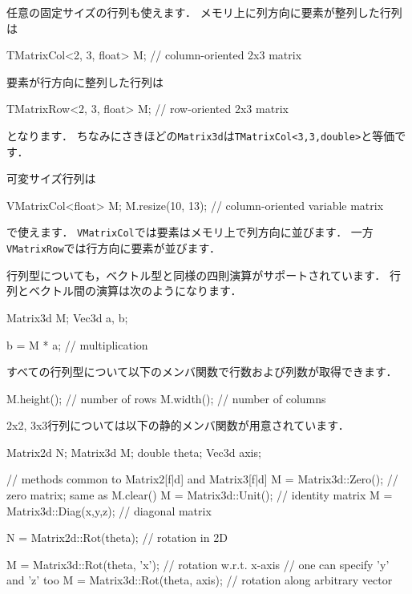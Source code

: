 \KLUDGE 任意の固定サイズの行列も使えます．
\KLUDGE メモリ上に列方向に要素が整列した行列は
\begin{sourcecode}
TMatrixCol<2, 3, float> M;    // column-oriented 2x3 matrix
\end{sourcecode}
\KLUDGE 要素が行方向に整列した行列は
\begin{sourcecode}
TMatrixRow<2, 3, float> M;    // row-oriented 2x3 matrix
\end{sourcecode}
\KLUDGE となります．
\KLUDGE ちなみにさきほどの\texttt{Matrix3d}は\texttt{TMatrixCol<3,3,double>}と等価です．

\KLUDGE 可変サイズ行列は
\begin{sourcecode}
VMatrixCol<float> M;
M.resize(10, 13);             // column-oriented variable matrix
\end{sourcecode}
\KLUDGE で使えます．
\texttt{VMatrixCol}では要素はメモリ上で列方向に並びます．
\KLUDGE 一方\texttt{VMatrixRow}では行方向に要素が並びます．

\KLUDGE 行列型についても，ベクトル型と同様の四則演算がサポートされています．
\KLUDGE 行列とベクトル間の演算は次のようになります．
\begin{sourcecode}
Matrix3d M;
Vec3d a, b;

b = M * a;               // multiplication
\end{sourcecode}

\KLUDGE すべての行列型について以下のメンバ関数で行数および列数が取得できます．
\begin{sourcecode}
M.height();              // number of rows
M.width();               // number of columns
\end{sourcecode}

2x2, 3x3行列については以下の静的メンバ関数が用意されています．
\begin{sourcecode}
Matrix2d N;
Matrix3d M;
double theta;
Vec3d axis;

// methods common to Matrix2[f|d] and Matrix3[f|d]
M = Matrix3d::Zero();        // zero matrix; same as M.clear()
M = Matrix3d::Unit();        // identity matrix
M = Matrix3d::Diag(x,y,z);   // diagonal matrix

N = Matrix2d::Rot(theta);    // rotation in 2D

M = Matrix3d::Rot(theta, 'x');    // rotation w.r.t. x-axis
                                  // one can specify 'y' and 'z' too
M = Matrix3d::Rot(theta, axis);   // rotation along arbitrary vector
\end{sourcecode}

